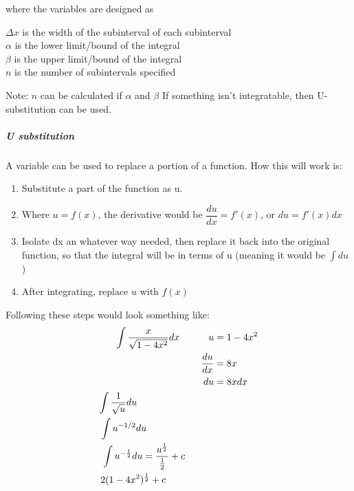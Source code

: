 \documentclass{article} %
\theoremstyle{theorem}
\theoremstyle{definition}
\begin{document}
                    where the variables are designed as
                    \begin{center}
                        $\Delta x$ is the width of the subinterval of each subinterval\\
                        $\alpha$ is the lower limit/bound of the integral\\
                        $\beta$ is the upper limit/bound of the integral\\
                        $n$ is the number of subintervals specified\\
                    \end{center}
                    Note: $n$ can be calculated if $\alpha$ and $\beta$
                    If something isn't integratable, then U-substitution can be used.
                \subparagraph{U substitution}
                    A variable can be used to replace a portion of a function. How this will work is:
                    \begin{enumerate}
                        \item Substitute a part of the function as u.
                        \item Where $u = f(x)$, the derivative would be $\dfrac{du}{dx} = f'(x)$, or $du = f'(x)dx$
                        \item Isolate dx an whatever way needed, then replace it back into the original function, so that the integral will be in terms of u (meaning it would be $\int du$)
                        \item After integrating, replace $u$ with $f(x)$
                    \end{enumerate}
                    Following these steps would look something like:
                    \begin{align*}
                        \int \dfrac{x}{\sqrt{1-4x^2}}dx \hspace{30px}
                        u &= 1-4x^2\\
                        \dfrac{du}{dx} &= 8x\\
                        du&=8xdx \\
                        \int \dfrac{1}{\sqrt{u}}du \hspace{80px}\\
                        \int u^{-1/2}du \hspace{70px}\\
                        \int u^{-\frac{1}{2}}du = \dfrac{u^{\frac{1}{2}}}{\frac{1}{2}}+c\hspace{30px}\\
                        2(1-4x^2)^{\frac{1}{2}}+c\hspace*{50px}
                    \end{align*}
\end{document}
